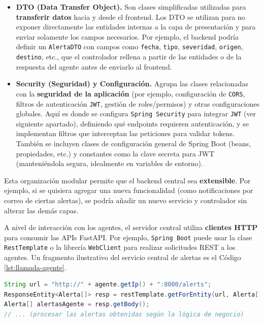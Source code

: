 \documentclass[11pt,a4paper,twoside]{report}
\begin{document}
\begin{itemize}
	\item \textbf{DTO (Data Transfer Object).} Son clases simplificadas utilizadas para \textbf{transferir datos} hacia y desde el frontend. Los DTO se utilizan para no exponer directamente las entidades internas a la capa de presentación y para enviar solamente los campos necesarios. Por ejemplo, el backend podría definir un \texttt{AlertaDTO} con campos como \texttt{fecha}, \texttt{tipo}, \texttt{severidad}, \texttt{origen}, \texttt{destino}, etc., que el controlador rellena a partir de las entidades o de la respuesta del agente antes de enviarlo al frontend.
	
	\item \textbf{Security (Seguridad) y Configuración.} Agrupa las clases relacionadas con la \textbf{seguridad de la aplicación} (por ejemplo, configuración de \texttt{CORS}, filtros de autenticación \texttt{JWT}, gestión de roles/permisos) y otras configuraciones globales. Aquí es donde se configura \texttt{Spring Security} para integrar \texttt{JWT} (ver siguiente apartado), definiendo qué endpoints requieren autenticación, y se implementan filtros que interceptan las peticiones para validar tokens. También se incluyen clases de configuración general de Spring Boot (beans, propiedades, etc.) y constantes como la clave secreta para JWT (manteniéndola segura, idealmente en variables de entorno).
\end{itemize}

Esta organización modular permite que el backend central sea \textbf{extensible}. Por ejemplo, si se quisiera agregar una nueva funcionalidad (como notificaciones por correo de ciertas alertas), se podría añadir un nuevo servicio y controlador sin alterar las demás capas.\newline

A nivel de interacción con los agentes, el servidor central utiliza \textbf{clientes HTTP} para consumir las APIs FastAPI. Por ejemplo, \texttt{Spring Boot} puede usar la clase \texttt{RestTemplate} o la librería \texttt{WebClient} para realizar solicitudes REST a los agentes. Un fragmento ilustrativo del servicio central de alertas es el Código \ref{lst:llamada-agente}.

\begin{lstlisting}[language=Java, caption={Ejemplo simplificado de llamada desde el backend central a un agente.}, label={lst:llamada-agente}]
String url = "http://" + agente.getIp() + ":8000/alerts";
ResponseEntity<Alerta[]> resp = restTemplate.getForEntity(url, Alerta[].class);
Alerta[] alertasAgente = resp.getBody();
// ... (procesar las alertas obtenidas según la lógica de negocio)
\end{lstlisting}
\end{document}
